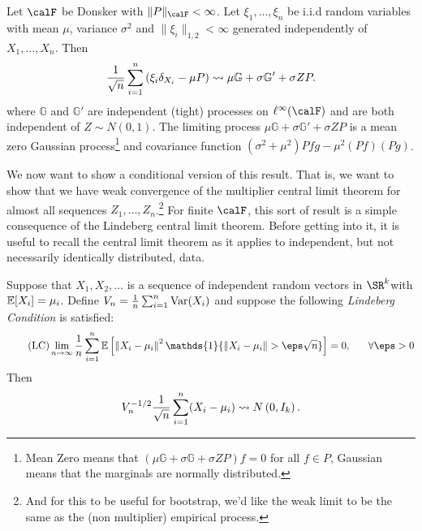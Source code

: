 \begin{corollary}
    \label{corr:unconditional-multiplier-clt}
	Let \(\calF\) be Donsker with \(\|P\|_\calF <\infty\). Let \(\xi_1,\dots,\xi_n\) be i.i.d random variables with mean \(\mu\), variance \(\sigma^2\) and \(\|\xi_i\|_{1,2} <\infty\) generated independently of \(X_1,\dots,X_n\). Then
	\[
		\frac{1}{\sqrt{n}}\sum_{i=1}^n \left(\xi_i\delta_{X_i}-\mu P\right)\rightsquigarrow \mu\mathbb{G}+\sigma\mathbb{G}' +\sigma Z P
	.\] 
	where \(\mathbb{G}\) and \(\mathbb{G}'\) are independent (tight) processes on \(\ell^\infty(\calF)\) and are both independent of \(Z\sim N(0,1)\). The limiting process \(\mu\mathbb{G}+\sigma\mathbb{G}'+\sigma ZP\) is a mean zero Gaussian process\footnote{Mean Zero means that \((\mu\mathbb{G}+\sigma\mathbb{G}+\sigma ZP)f = 0\) for all \(f\in P\), Gaussian means that the marginals are normally distributed.} and covariance function \((\sigma^2+\mu^2)Pfg-\mu^2(Pf)(Pg)\).
\end{corollary}
We now want to show a conditional version of this result. That is, we want to show that we have weak convergence of the multiplier central limit theorem for almost all sequences \(Z_1,\dots,Z_n\).\footnote{And for this to be useful for bootstrap, we'd like the weak limit to be the same as the (non multiplier) empirical process.} For finite \(\calF\), this sort of result is a simple consequence of the Lindeberg central limit theorem. Before getting into it, it is useful to recall the central limit theorem as it applies to independent, but not necessarily identically distributed, data.

\begin{theorem}
	\label{thm:lindeberg-clt}
	Suppose that \(X_1,X_2,\dots\) is a sequence of independent random vectors in \(\SR^k\)with \(\mathbb{E}[X_i] = \mu_i\). Define \(V_n = \frac{1}{n}\sum_{i=1}^n \operatorname{Var}(X_i)\) and suppose the following \emph{Lindeberg Condition} is satisfied:
	\begin{equation}
		\label{eq:lindeberg-condition}
		\tag{LC}
		\lim_{n\to\infty} \frac{1}{n}\sum_{i=1}^n \E\left[\left\|X_i-\mu_i\right\|^2\mathds{1}\{\|X_i-\mu_i\|>\eps \sqrt{n}\}\right] = 0,\;\;\;\;\;\;\forall \eps >0
	\end{equation}
	Then 
	\[
		V_n^{-1/2}\frac{1}{\sqrt{n}}\sum_{i=1}^n (X_i-\mu_i) \rightsquigarrow N\left(0,I_k\right)
	.\] 
\end{theorem}

